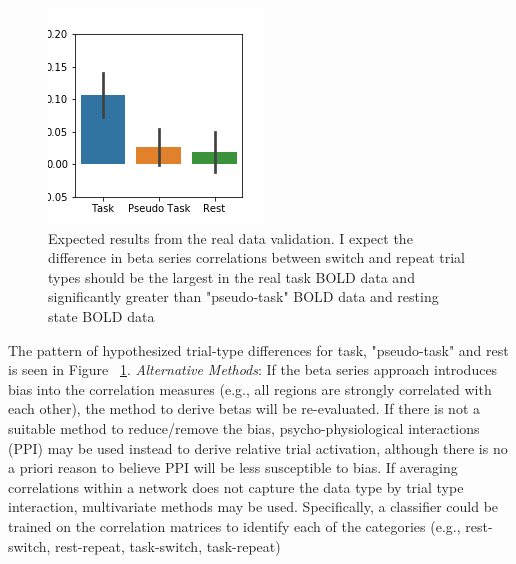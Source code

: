 \documentclass[phd,appendix,figures]{uithesis}
\begin{document}
\begin{figure}[H]%
	\centering
	\includegraphics[width=1\linewidth]{aim_1_validation}
	\caption{Expected results from the real data validation.
	I expect the difference in beta series correlations between switch and repeat trial types should be the largest in the real task BOLD data and significantly greater than "pseudo-task" BOLD data and resting state BOLD data}
	\label{fig:aim_1_validation}
\end{figure}
The pattern of hypothesized trial-type differences for task, "pseudo-task" and rest is seen in Figure ~\ref{fig:aim_1_validation}.
\newline
\newline
\textit{Alternative Methods}: If the beta series approach introduces bias into the correlation measures (e.g., all regions are strongly correlated with each other), the method to derive betas will be re-evaluated.
If there is not a suitable method to reduce/remove the bias, psycho-physiological interactions (PPI) may be used instead to derive relative trial activation, although there is no a priori reason to believe PPI will be less susceptible to bias.
If averaging correlations within a network does not capture the data type by trial type interaction, multivariate methods may be used.
Specifically, a classifier could be trained on the correlation matrices to identify each of the categories (e.g., rest-switch, rest-repeat, task-switch, task-repeat)
\end{document}
